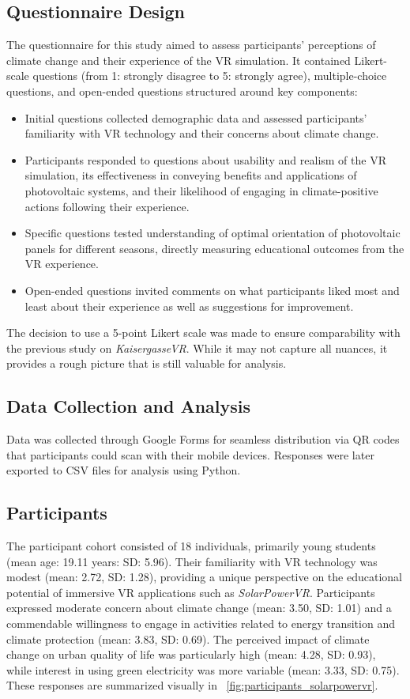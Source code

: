 \documentclass[draft, final]{vutinfth} %
\begin{document}
\subsection{Questionnaire Design}
The questionnaire for this study aimed to assess participants' perceptions of climate change and their experience of the VR simulation. It contained Likert-scale questions (from 1: strongly disagree to 5: strongly agree), multiple-choice questions, and open-ended questions structured around key components:
\begin{itemize}
\item Initial questions collected demographic data and assessed participants' familiarity with VR technology and their concerns about climate change.
\item Participants responded to questions about usability and realism of the VR simulation, its effectiveness in conveying benefits and applications of photovoltaic systems, and their likelihood of engaging in climate-positive actions following their experience.
\item Specific questions tested understanding of optimal orientation of photovoltaic panels for different seasons, directly measuring educational outcomes from the VR experience.
\item Open-ended questions invited comments on what participants liked most and least about their experience as well as suggestions for improvement.
\end{itemize}

The decision to use a 5-point Likert scale was made to ensure comparability with the previous study on \textit{KaisergasseVR}. While it may not capture all nuances, it provides a rough picture that is still valuable for analysis.

\subsection{Data Collection and Analysis}
Data was collected through Google Forms for seamless distribution via QR codes that participants could scan with their mobile devices. Responses were later exported to CSV files for analysis using Python.

\subsection{Participants}
The participant cohort consisted of 18 individuals, primarily young students (mean age: 19.11 years: SD: 5.96). Their familiarity with VR technology was modest (mean: 2.72, SD: 1.28), providing a unique perspective on the educational potential of immersive VR applications such as \textit{SolarPowerVR}. Participants expressed moderate concern about climate change (mean: 3.50, SD: 1.01) and a commendable willingness to engage in activities related to energy transition and climate protection (mean: 3.83, SD: 0.69). The perceived impact of climate change on urban quality of life was particularly high (mean: 4.28, SD: 0.93), while interest in using green electricity was more variable (mean: 3.33, SD: 0.75). These responses are summarized visually in \figurename~\ref{fig:participants_solarpowervr}.
\end{document}
